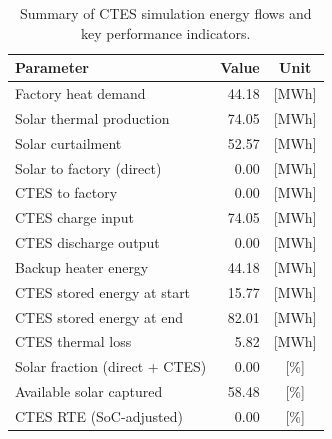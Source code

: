 \renewcommand{\arraystretch}{1.2}
\begin{table}[h]
\centering
\begin{tabular}{l|r c}
\hline
Parameter & Value & Unit \\
\hline
Factory heat demand & 44.18 & [MWh] \\
Solar thermal production & 74.05 & [MWh] \\
Solar curtailment & 52.57 & [MWh] \\
Solar to factory (direct) & 0.00 & [MWh] \\
CTES to factory & 0.00 & [MWh] \\
CTES charge input & 74.05 & [MWh] \\
CTES discharge output & 0.00 & [MWh] \\
Backup heater energy & 44.18 & [MWh] \\
CTES stored energy at start & 15.77 & [MWh] \\
CTES stored energy at end & 82.01 & [MWh] \\
CTES thermal loss & 5.82 & [MWh] \\
\hline
Solar fraction (direct + CTES) & 0.00 & [\%] \\
Available solar captured & 58.48 & [\%] \\
CTES RTE (SoC-adjusted) & 0.00 & [\%] \\
\hline
\end{tabular}
\caption{Summary of CTES simulation energy flows and key performance indicators.}
\label{tab:ctes-simulation-summary}
\end{table}
